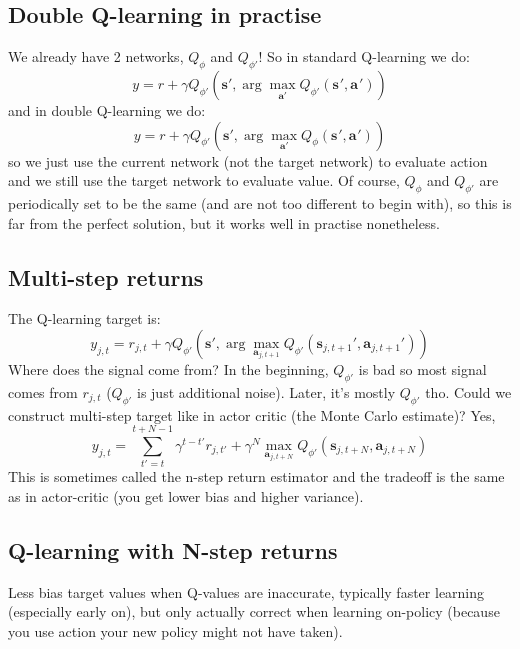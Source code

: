 \documentclass{report}
\newcommand{\argmax}{\arg\!\max}
\begin{document}
\subsection{Double Q-learning in practise}
We already have 2 networks, $Q_\phi$ and $Q_{\phi'}$!
So in standard Q-learning we do:
\begin{equation}
		y = r + \gamma Q_{\phi'}\left( \bm{s}', \argmax_{\bm{a}'}Q_{\phi'}(\bm{s}_{}', \bm{a}_{}') \right)
\end{equation}
and in double Q-learning we do:
\begin{equation}
		y = r + \gamma Q_{\phi'}\left( \bm{s}', \argmax_{\bm{a}'}Q_{\phi}(\bm{s}_{}', \bm{a}_{}') \right)
\end{equation}
so we just use the current network (not the target network) to evaluate action
and we still use the target network to evaluate value.
Of course, $Q_\phi$ and $Q_{\phi'}$ are periodically set to be the same (and are not too different to begin with), 
so this is far from the perfect solution, 
but it works well in practise nonetheless.

\subsection{Multi-step returns}
The Q-learning target is:
\begin{equation}
y_{j,t} = r_{j,t} + \gamma Q_{\phi'}\left( \bm{s}', \argmax_{\bm{a}_{j,t+1}}Q_{\phi'}(\bm{s}_{j,t+1}', \bm{a}_{j,t+1}') \right)
\end{equation}
Where does the signal come from?
In the beginning, $Q_{\phi'}$ is bad so most signal comes from $r_{j,t}$ ($Q_{\phi'}$ is just additional noise).
Later, it's mostly $Q_{\phi'}$ tho.
Could we construct multi-step target like in actor critic (the Monte Carlo estimate)?
Yes,
\begin{equation}
		y_{j,t} = \sum_{t'=t}^{t+N-1} \gamma^{t-t'}    r_{j,t'} + \gamma^N  \max_{\bm{a}_{j,t+N}}Q_{\phi'}(\bm{s}_{j,t+N}, \bm{a}_{j,t+N}) 
\end{equation}
This is sometimes called the n-step return estimator and the tradeoff is the same as in actor-critic (you get lower bias
and higher variance).

\subsection{Q-learning with N-step returns}
Less bias target values when Q-values are inaccurate,
typically faster learning (especially early on), but only actually correct when learning on-policy (because you use action
your new policy might not have taken).
\end{document}

